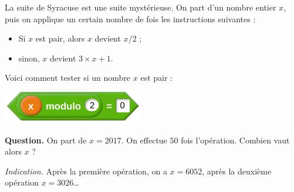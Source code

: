 \documentclass[class=report,crop=false, 12pt]{standalone}
\begin{document}


\begin{enigme}

La suite de Syracuse est une suite mystérieuse.
On part d'un nombre entier $x$, puis on applique un certain nombre de fois les instructions suivantes :
\begin{itemize}
  \item Si $x$ est pair, alors $x$ devient $x/2$ ;
  \item sinon, $x$ devient $3\times x + 1$.
\end{itemize}


\bigskip

Voici comment tester si un nombre $x$ est pair :
\begin{center}
  \includegraphics[scale=\scalebloc]{bloc-07-eg1}      
\end{center}

\textbf{Question.} On part de $x=2017$.  On effectue $50$ fois l'opération. Combien vaut alors $x$ ?

\emph{Indication.} Après la première opération, on a $x=6052$, après la deuxième opération $x=3026$\ldots

\bigskip


\end{enigme}
\end{document}
